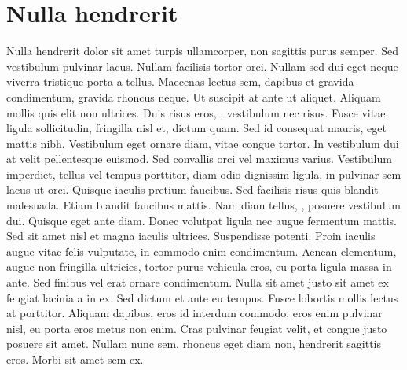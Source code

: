 \section{Nulla hendrerit}\markdownRendererInterblockSeparator
{}Nulla hendrerit dolor sit amet turpis ullamcorper, non sagittis purus semper. Sed vestibulum pulvinar lacus. Nullam facilisis tortor orci. Nullam sed dui eget neque viverra tristique porta a tellus. Maecenas lectus sem, dapibus et gravida condimentum, gravida rhoncus neque. Ut suscipit at ante ut aliquet. Aliquam mollis quis elit non ultrices. Duis risus eros, , vestibulum nec risus. Fusce vitae ligula sollicitudin, fringilla nisl et, dictum quam. Sed id consequat mauris, eget mattis nibh. Vestibulum eget ornare diam, vitae congue tortor. In vestibulum dui at velit pellentesque euismod. Sed convallis orci vel maximus varius. Vestibulum imperdiet, tellus vel tempus porttitor, diam odio dignissim ligula, in pulvinar sem lacus ut orci. Quisque iaculis pretium faucibus. Sed facilisis risus quis blandit malesuada.\markdownRendererInterblockSeparator
{}Etiam blandit faucibus mattis. Nam diam tellus, , posuere vestibulum dui. Quisque eget ante diam. Donec volutpat ligula nec augue fermentum mattis. Sed sit amet nisl et magna iaculis ultrices. Suspendisse potenti. Proin iaculis augue vitae felis vulputate, in commodo enim condimentum. Aenean elementum, augue non fringilla ultricies, tortor purus vehicula eros, eu porta ligula massa in ante. Sed finibus vel erat ornare condimentum. Nulla sit amet justo sit amet ex feugiat lacinia a in ex. Sed dictum et ante eu tempus. Fusce lobortis mollis lectus at porttitor. Aliquam dapibus, eros id interdum commodo, eros enim pulvinar nisl, eu porta eros metus non enim. Cras pulvinar feugiat velit, et congue justo posuere sit amet. Nullam nunc sem, rhoncus eget diam non, hendrerit sagittis eros. Morbi sit amet sem ex. \relax
